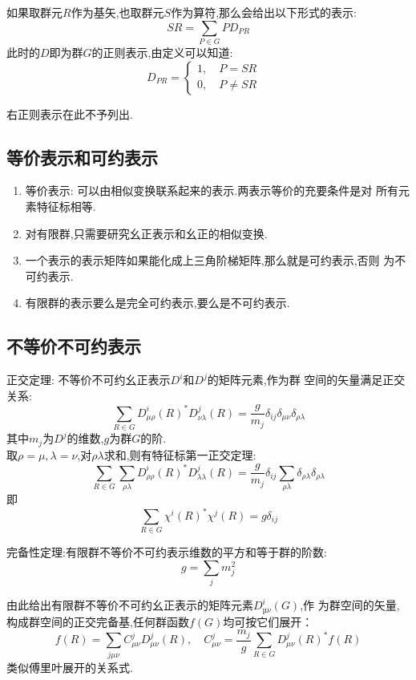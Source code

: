 \documentclass{ctexart}
\begin{document}
\noindent 如果取群元$R$作为基矢,也取群元$S$作为算符,那么会给出以下形式的表示:
\begin{equation}
    SR=\sum_{P\in G}PD_{PR}
\end{equation}
此时的$D$即为群$G$的正则表示,由定义可以知道:
\[
D_{PR}=\begin{cases}
1,\quad P=SR & \\
0,\quad P\neq SR &
\end{cases}
\]

右正则表示在此不予列出.

\subsection{等价表示和可约表示}

\begin{enumerate}
    \item 等价表示: 可以由相似变换联系起来的表示.两表示等价的充要条件是对
    所有元素特征标相等.
    \item 对有限群,只需要研究幺正表示和幺正的相似变换.
    \item 一个表示的表示矩阵如果能化成上三角阶梯矩阵,那么就是可约表示,否则
    为不可约表示.
    \item 有限群的表示要么是完全可约表示,要么是不可约表示.
\end{enumerate}

\subsection{不等价不可约表示}

\noindent 正交定理: 不等价不可约幺正表示$D^{i}$和$D^{j}$的矩阵元素,作为群
空间的矢量满足正交关系:
\[
\sum_{R\in G}D^{i}_{\mu\rho}(R)^{*}D^{j}_{\nu\lambda}(R)=\frac{g}{m_{j}}\delta_{ij}\delta_{\mu\nu}\delta_{\rho\lambda}
\]
其中$m_{j}$为$D^{j}$的维数,$g$为群$G$的阶.\\
取$\rho=\mu,\lambda=\nu$,对$\rho\lambda$求和,则有特征标第一正交定理:
\[
\sum_{R\in G}\sum_{\rho\lambda}D^{i}_{\rho\rho}(R)^{*}D^{j}_{\lambda\lambda}(R)=\frac{g}{m_{j}}\delta_{ij}\sum_{\rho\lambda}\delta_{\rho\lambda}\delta_{\rho\lambda}
\]
即
\[
\sum_{R\in G}\chi^{i}(R)^{*}\chi^{j}(R)=g\delta_{ij}
\]

\noindent 完备性定理:有限群不等价不可约表示维数的平方和等于群的阶数:
\[
g=\sum_{j}m_{j}^{2}
\]

\noindent 由此给出有限群不等价不可约幺正表示的矩阵元素$D^{i}_{µν}(G)$,作
为群空间的矢量,构成群空间的正交完备基,任何群函数$f(G)$均可按它们展开：
\[
f(R)=\sum_{j\mu\nu}C^{j}_{\mu\nu}D^{j}_{\mu\nu}(R),\quad C^{j}_{\mu\nu}=\frac{m_{j}}{g}\sum_{R\in G}D^{j}_{\mu\nu}(R)^{*}f(R)
\]
类似傅里叶展开的关系式.\\
\end{document}
